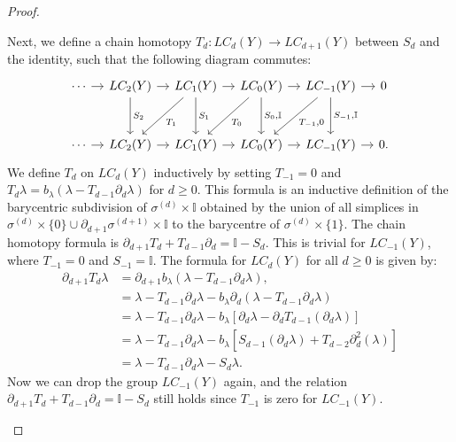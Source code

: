 \begin{proof}
\begin{enumerate}
	Next, we define a chain homotopy $T_d: LC_d(Y) \rightarrow LC_{d+1}(Y)$ between $S_d$ and the identity, such that the following diagram commutes:
	\begin{equation}
			\begin{tikzcd}[row sep=3em, column sep = 1em]
				\cdots \arrow[r] & LC_2(Y) \arrow[r] \arrow[d, "S_2"] & LC_1(Y) \arrow[r] \arrow[ld, "T_1"] \arrow[d, "S_1"] & LC_0(Y) \arrow[r] \arrow[ld, "T_0"] \arrow[d, "{S_0,\mathbb{I}}"] & LC_{-1}(Y) \arrow[r] \arrow[ld, "{T_{-1},0}"] \arrow[d, "{S_{-1},\mathbb{I}}"] & 0 \\
				\cdots \arrow[r] & LC_2(Y) \arrow[r]                & LC_1(Y) \arrow[r]                                & LC_0(Y) \arrow[r]                                             & LC_{-1}(Y) \arrow[r]                                                 & 0.
			\end{tikzcd}
	\end{equation}
	We define $T_d$ on $LC_d(Y)$ inductively by setting $T_{-1}=0$ and $T_d\lambda = b_\lambda(\lambda-T_{d-1}\partial_d\lambda)$ for $d \geq 0$. This formula is an inductive definition of the barycentric subdivision of $\sigma^{(d)} \times \mathbb{I}$ obtained by the union of all simplices in $\sigma^{(d)} \times \{0\} \cup \partial_{d+1} \sigma^{(d+1)} \times \mathbb{I}$ to the barycentre of $\sigma^{(d)} \times \{1\}$. The chain homotopy formula is $\partial_{d+1} T_{d} + T_{d-1}\partial_{d} = \mathbb{I} - S_{d}$. This is trivial for $LC_{-1}(Y)$, where $T_{-1}=0$ and $S_{-1}=\mathbb{I}$. The formula for $LC_d(Y)$ for all $d \geq 0$ is given by:
	\begin{align}
		\partial_{d+1} T_d\lambda & = \partial_{d+1} b_\lambda(\lambda - T_{d-1}\partial_{d
		}\lambda), \nonumber\\
		                  & = \lambda - T_{d-1}\partial_{d}\lambda - b_\lambda\partial_d(\lambda - T_{d-1}\partial_{d}\lambda) \nonumber\\
		                  & = \lambda - T_{d-1}\partial_d\lambda - b_\lambda[\partial_d\lambda - \partial_d T_{d-1}(\partial_d\lambda)] \nonumber\\
		                  & = \lambda - T_{d-1}\partial_d\lambda - b_\lambda[S_{d-1}(\partial_d\lambda) + T_{d-2}\partial^2_d(\lambda)] \nonumber\\
		                  & = \lambda - T_{d-1}\partial_d\lambda - S_d\lambda.                                                  
	\end{align}
	Now we can drop the group $LC_{-1}(Y)$ again, and the relation $\partial_{d+1} T_{d} + T_{d-1}\partial_{d} = \mathbb{I} - S_d$ still holds since $T_{-1}$ is zero for $LC_{-1}(Y)$.
		

\end{enumerate}
\end{proof}
